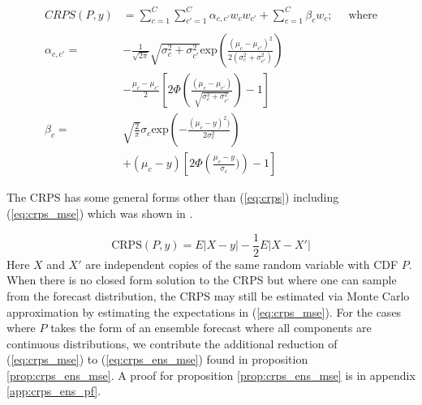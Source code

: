 \begin{equation}
\begin{aligned}
    \label{eq:norm_mix_crps}
     CRPS(P, y) &= \sum_{c = 1}^C \sum_{c' = 1}^C \alpha_{c, c'}w_c w_{c'} + 
     \sum_{c = 1}^C \beta_c w_c; \quad \text{ where}\\~  \\
        \alpha_{c,c'} = &-\frac{1}{\sqrt{2\pi}}\sqrt{\sigma_c^2 + 
        \sigma_{c'}^2} \text{exp} 
        \left( \frac{(\mu_c - \mu_{c'})^2}{2 (\sigma_c^2 + 
        \sigma_{c'}^2)}\right) \\
        &-\frac{\mu_c - \mu_{c'}}{2}\left[2 \Phi 
        \left(\frac{(\mu_c - \mu_{c'})}{\sqrt{\sigma_c^2 + 
        \sigma_{c'}^2}}\right) - 1 \right] \\
        \beta_c = &\sqrt{\frac{2}{\pi}}\sigma_c 
        \text{exp}\left(-\frac{(\mu_c - y)^2)}{2\sigma_c^2}\right) \\
        &+ (\mu_c - y) \left[2\Phi\left(\frac{\mu_c - y}{\sigma_c}) 
        \right) - 1\right] 
\end{aligned}
\end{equation}

The CRPS has some general forms other than (\ref{eq:crps}) including 
(\ref{eq:crps_mse}) which was shown in \cite{gneiting2007strictly}.

\begin{equation}
    \label{eq:crps_mse}
    \text{CRPS}(P, y) = E|X -y| - \frac{1}{2} E|X - X'|
\end{equation}
Here $X$ and $X'$ are independent copies of the same random variable with 
CDF $P$. When there is no closed form solution to the CRPS but where one 
can sample from the forecast distribution, the CRPS may still be estimated 
via Monte Carlo approximation by estimating the expectations in 
(\ref{eq:crps_mse}). For the cases where $P$ takes the form of an ensemble 
forecast where all components are continuous distributions, we contribute the
additional reduction of
(\ref{eq:crps_mse}) to (\ref{eq:crps_ens_mse}) found in proposition 
\ref{prop:crps_ens_mse}. A 
proof for proposition \ref{prop:crps_ens_mse} 
is in appendix \ref{app:crps_ens_pf}. 

